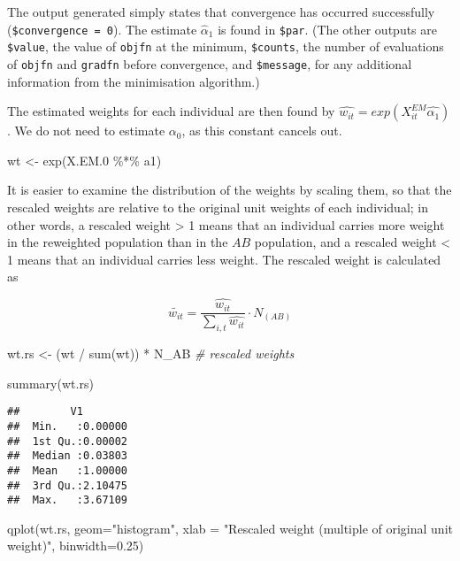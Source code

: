 \documentclass[
]{article}
\newenvironment{Shaded}{\begin{snugshade}}{\end{snugshade}}
\newcommand{\AttributeTok}[1]{\textcolor[rgb]{0.77,0.63,0.00}{#1}}
\newcommand{\CommentTok}[1]{\textcolor[rgb]{0.56,0.35,0.01}{\textit{#1}}}
\newcommand{\FloatTok}[1]{\textcolor[rgb]{0.00,0.00,0.81}{#1}}
\newcommand{\FunctionTok}[1]{\textcolor[rgb]{0.00,0.00,0.00}{#1}}
\newcommand{\NormalTok}[1]{#1}
\newcommand{\OtherTok}[1]{\textcolor[rgb]{0.56,0.35,0.01}{#1}}
\newcommand{\SpecialCharTok}[1]{\textcolor[rgb]{0.00,0.00,0.00}{#1}}
\newcommand{\StringTok}[1]{\textcolor[rgb]{0.31,0.60,0.02}{#1}}
\begin{document}
The output generated simply states that convergence has occurred
successfully (\texttt{\$convergence\ =\ 0}). The estimate
\(\hat{\alpha}_{1}\) is found in \texttt{\$par}. (The other outputs are
\texttt{\$value}, the value of \texttt{objfn} at the minimum,
\texttt{\$counts}, the number of evaluations of \texttt{objfn} and
\texttt{gradfn} before convergence, and \texttt{\$message}, for any
additional information from the minimisation algorithm.)

The estimated weights for each individual are then found by
\(\hat{w_{it}}=exp(X_{it}^{EM}\hat{\alpha_1})\). We do not need to
estimate \(\alpha_{0}\), as this constant cancels out.

\begin{Shaded}
\begin{Highlighting}[]
\NormalTok{wt }\OtherTok{\textless{}{-}} \FunctionTok{exp}\NormalTok{(X.EM}\FloatTok{.0} \SpecialCharTok{\%*\%}\NormalTok{ a1)}
\end{Highlighting}
\end{Shaded}

It is easier to examine the distribution of the weights by scaling them,
so that the rescaled weights are relative to the original unit weights
of each individual; in other words, a rescaled weight \textgreater{} 1
means that an individual carries more weight in the reweighted
population than in the \(AB\) population, and a rescaled weight
\textless{} 1 means that an individual carries less weight. The rescaled
weight is calculated as

\[\tilde{w_{it}}=\frac{\hat{w_{it}}}{\sum_{i,t}\hat{w_{it}}}\cdot N_{(AB)}\]

\begin{Shaded}
\begin{Highlighting}[]
\NormalTok{wt.rs }\OtherTok{\textless{}{-}}\NormalTok{ (wt }\SpecialCharTok{/} \FunctionTok{sum}\NormalTok{(wt)) }\SpecialCharTok{*}\NormalTok{ N\_AB  }\CommentTok{\# rescaled weights}

\FunctionTok{summary}\NormalTok{(wt.rs)}
\end{Highlighting}
\end{Shaded}

\begin{verbatim}
##        V1         
##  Min.   :0.00000  
##  1st Qu.:0.00002  
##  Median :0.03803  
##  Mean   :1.00000  
##  3rd Qu.:2.10475  
##  Max.   :3.67109
\end{verbatim}

\begin{Shaded}
\begin{Highlighting}[]
\FunctionTok{qplot}\NormalTok{(wt.rs, }\AttributeTok{geom=}\StringTok{"histogram"}\NormalTok{,}
      \AttributeTok{xlab =} \StringTok{"Rescaled weight (multiple of original unit weight)"}\NormalTok{,}
      \AttributeTok{binwidth=}\FloatTok{0.25}\NormalTok{)}
\end{Highlighting}
\end{Shaded}
\end{document}

